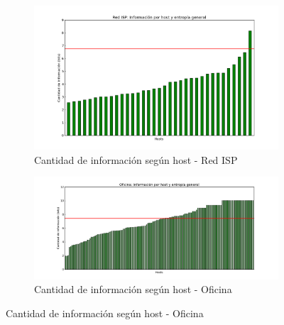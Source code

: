 \begin{figure}[H]
        \begin{subfigure}[H]{0.5\textwidth}
                \centering
                \includegraphics[width=1\textwidth]{graficos/infoHost_casa.png}
                \caption{Cantidad de informaci\'on seg\'un host - Red ISP}
                \label{fig:info1}
        \end{subfigure}
        \begin{subfigure}[H]{0.5\textwidth}
                \centering
                \includegraphics[width=1\textwidth]{graficos/infoHost_oficina.png}
                \caption{Cantidad de informaci\'on seg\'un host - Oficina}
                \label{fig:info2}
        \end{subfigure}
\end{figure}

